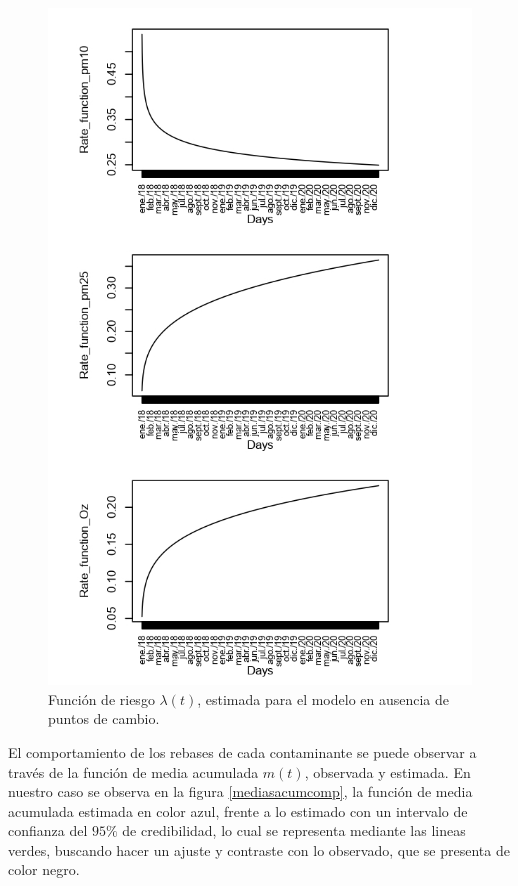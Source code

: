 \begin{figure}[!h]
\begin{center}
\includegraphics[width=13cm]{RIESGOSPC}
\end{center}
\centering
\caption{ Función de riesgo $\lambda (t) $, estimada para el modelo en ausencia de puntos de cambio.  }
\label{riesgo}
\end{figure}


El comportamiento de los rebases de cada contaminante se puede observar a través de la función de media acumulada $m(t)$, observada y estimada. En nuestro caso se observa en la figura  \ref{mediasacumcomp}, la función de media acumulada estimada en color azul, frente a lo estimado con un intervalo de confianza del $95\%$ de credibilidad, lo cual se representa mediante las lineas verdes, buscando hacer un ajuste y contraste con lo observado, que se presenta de color negro.



